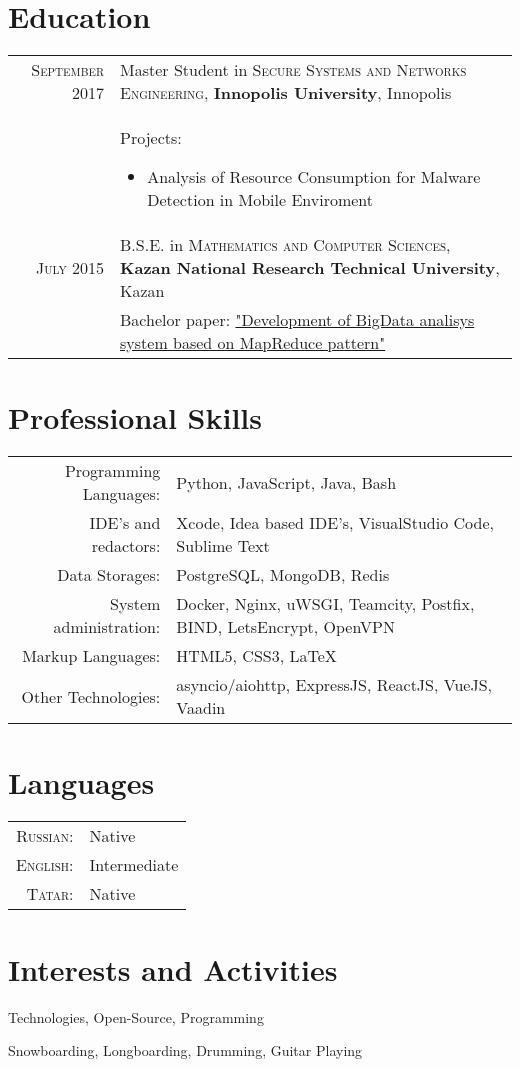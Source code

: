 \documentclass[a4paper,10pt]{article}
\begin{document}
\section{Education}
\begin{tabular}{r p{11cm}}	
 \textsc{September} 2017 & Master Student in \textsc{Secure Systems and Networks Engineering}, \textbf{Innopolis University}, Innopolis\\
 & Projects:
 \begin{itemize}
    \item Analysis of Resource Consumption for Malware Detection in Mobile Enviroment
 \end{itemize}\\
 \textsc{July} 2015 & B.S.E. in \textsc{Mathematics and Computer Sciences}, \textbf{Kazan National Research Technical University}, Kazan\\
 & Bachelor paper: \href{https://github.com/litleleprikon/bachelor\_paper}{"Development of BigData analisys system based on MapReduce pattern"}\\
\end{tabular}

\section{Professional Skills}
\begin{tabular}{r p{11cm}}

 Programming Languages:  &  Python, JavaScript, Java, Bash\\
 IDE's and redactors:    &  Xcode, Idea based IDE's, VisualStudio Code, Sublime Text\\
 Data Storages:          &  PostgreSQL, MongoDB, Redis \\
 System administration:  &  Docker, Nginx, uWSGI, Teamcity, Postfix, BIND, LetsEncrypt, OpenVPN\\
 Markup Languages:       &  HTML5, CSS3, \LaTeX \\
 Other Technologies:     &  asyncio/aiohttp, ExpressJS, ReactJS, VueJS, Vaadin
 
\end{tabular}

\section{Languages}
\begin{tabular}{r p{11cm}}
 \textsc{Russian:}&Native\\
\textsc{English:}&Intermediate\\
\textsc{Tatar:}&Native\\
\end{tabular}

\section{Interests and Activities}
Technologies, Open-Source, Programming \par
Snowboarding, Longboarding, Drumming, Guitar Playing
\end{document}
